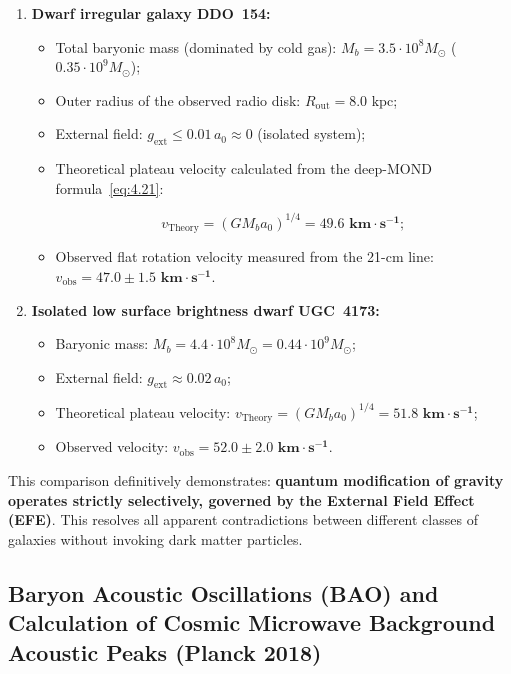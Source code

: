 \begin{enumerate}
\item \textbf{Dwarf irregular galaxy DDO~154:}

\begin{itemize}
\item Total baryonic mass (dominated by cold  gas): $M_b = 3.5 \cdot 10^8 M_\odot$ ($0.35 \cdot 10^9 M_\odot$);
\item Outer radius of the observed radio disk: $R_{\text{out}} = 8.0\text{ kpc}$;
\item External field: $g_{\text{ext}} \le 0.01\,a_0 \approx 0$ (isolated system);
\item Theoretical plateau velocity calculated from the deep-MOND formula~\eqref{eq:4.21}:

\begin{equation}\label{eq:4.38}\tag{4.38}
v_{\text{Theory}} = (G M_b a_0)^{1/4} = \mathbf{49.6\text{ km}\cdot\text{s}^{-1}};
\end{equation}

\item Observed flat rotation velocity measured from the  21-cm line: $v_{\text{obs}} = \mathbf{47.0 \pm 1.5\text{ km}\cdot\text{s}^{-1}}$.
\end{itemize}

\item \textbf{Isolated low surface brightness dwarf UGC~4173:}

\begin{itemize}
\item Baryonic mass: $M_b = 4.4 \cdot 10^8 M_\odot = 0.44 \cdot 10^9 M_\odot$;
\item External field: $g_{\text{ext}} \approx 0.02\,a_0$;
\item Theoretical plateau velocity: $v_{\text{Theory}} = (G M_b a_0)^{1/4} = \mathbf{51.8\text{ km}\cdot\text{s}^{-1}}$;
\item Observed velocity: $v_{\text{obs}} = \mathbf{52.0 \pm 2.0\text{ km}\cdot\text{s}^{-1}}$.
\end{itemize}
\end{enumerate}

This comparison definitively demonstrates: \textbf{quantum modification of gravity operates strictly selectively, governed by the External Field Effect (EFE)}. This resolves all apparent contradictions between different classes of galaxies without invoking dark matter particles.


\subsection{Baryon Acoustic Oscillations (BAO) and Calculation of Cosmic Microwave Background Acoustic Peaks (Planck 2018)}\label{sec:4.4}

